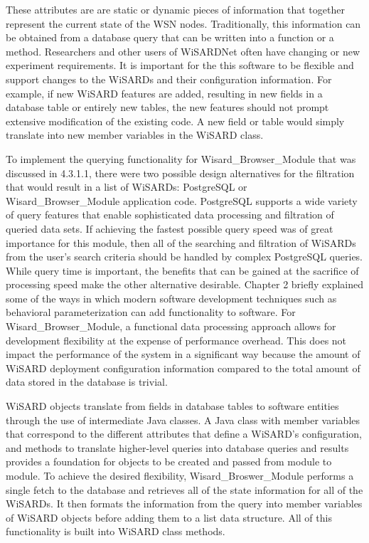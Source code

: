 These attributes are are static or dynamic pieces of information that together represent the current state of the WSN nodes. Traditionally, this information can be obtained from a database query that can be written into a function or a method. Researchers and other users of WiSARDNet often have changing or new experiment requirements. It is important for the this software to be flexible and support changes to the WiSARDs and their configuration information. For example, if new WiSARD features are added, resulting in new fields in a database table or entirely new tables, the new features should not prompt extensive modification of the existing code. A new field or table would simply translate into new member variables in the WiSARD class. 

To implement the querying functionality for Wisard\_Browser\_Module that was discussed in 4.3.1.1, there were two possible design alternatives for the filtration that would result in a list of WiSARDs: PostgreSQL or Wisard\_Browser\_Module application code. PostgreSQL supports a wide variety of query features that enable sophisticated data processing and filtration of queried data sets. If achieving the fastest possible query speed was of great importance for this module, then all of the searching and filtration of WiSARDs from the user's search criteria should be handled by complex PostgreSQL queries. While query time is important, the benefits that can be gained at the sacrifice of processing speed make the other alternative desirable. Chapter 2 briefly explained some of the ways in which modern software development techniques such as behavioral parameterization can add functionality to software. For Wisard\_Browser\_Module, a functional data processing approach allows for development flexibility at the expense of performance overhead. This does not impact the performance of the system in a significant way because the amount of WiSARD deployment configuration information compared to the total amount of data stored in the database is trivial.

WiSARD objects translate from fields in database tables to software entities through the use of intermediate Java classes. A Java class with member variables that correspond to the different attributes that define a WiSARD's configuration, and methods to translate higher-level queries into database queries and results provides a foundation for objects to be created and passed from module to module. To achieve the desired flexibility, Wisard\_Broswer\_Module performs a single fetch to the database and retrieves all of the state information for all of the WiSARDs. It then formats the information from the query into member variables of WiSARD objects before adding them to a list data structure. All of this functionality is built into WiSARD class methods.

